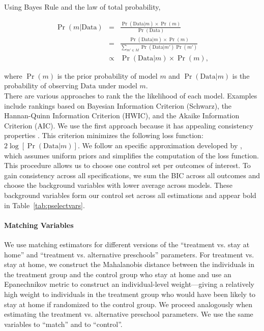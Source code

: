 \pagebreak
\noindent Using Bayes Rule and the law of total probability,

\begin{eqnarray}
\Pr( m | \text{Data} ) &=& \frac{\Pr(\text{Data} | m)\times \Pr(m)}{ \Pr(\text{Data})}\\ \nonumber
&=& \frac{\Pr(\text{Data} | m)\times \Pr(m)}{\sum \limits _{m' \in M} \Pr (\text{Data} | m') \Pr(m')} \\ \nonumber
&\propto& \Pr (\text{Data} | m) \times \Pr(m),
\end{eqnarray}

\noindent where $\Pr(m)$ is the prior probability of model $m$ and $\Pr(\text{Data} | m)$ is the probability of observing $\text{Data}$ under model $m$.\\

\noindent There are various approaches to rank the the likelihood of each model. Examples include rankings based on Bayesian Information Criterion (Schwarz), the Hannan-Quinn Information Criterion (HWIC), and the Akaike Information Criterion (AIC). We use the first approach because it has appealing consistency properties \citep{Diebold_2007_Forecasting}. This criterion minimizes the following loss function: $2 \log [\Pr( \text{Data} | m)]$. We follow an specific approximation developed by \citet{Claeskens-Hjort_2008_Model-Selection}, which assumes uniform priors and simplifies the computation of the loss function.\\

\noindent This procedure allows us to choose one control set per outcomes of interest. To gain consistency across all specifications, we sum the BIC across all outcomes and choose the background variables with lower average across models. These background variables form our control set across all estimations and appear bold in Table~\ref{tab:pselectvars}.\\

\paragraph{Matching Variables}\label{app:matching-is-fun}

\noindent We use matching estimators for different versions of the ``treatment vs. stay at home'' and ``treatment vs. alternative preschools'' parameters. For treatment vs. stay at home, we construct the Mahalanobis distance between the individuals in the treatment group and the control group who stay at home and use an Epanechnikov metric to construct an individual-level weight---giving a relatively high weight to individuals in the treatment group who would have been likely to stay at home if randomized to the control group. We proceed analogously when estimating the treatment vs. alternative preschool parameters. We use the same variables to ``match'' and to ``control''.\\


